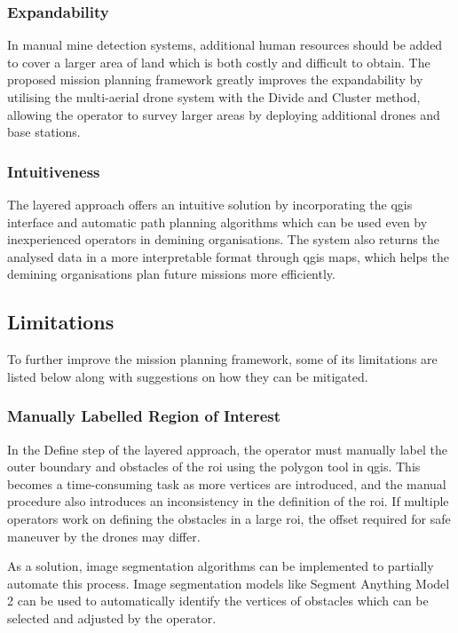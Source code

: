 \subsubsection{Expandability}

In manual mine detection systems, additional human resources should be added to cover a larger area of land which is both costly and difficult to obtain. The proposed mission planning framework greatly improves the expandability by utilising the multi-aerial drone system with the Divide and Cluster method, allowing the operator to survey larger areas by deploying additional drones and base stations. 

\subsubsection{Intuitiveness}

The layered approach offers an intuitive solution by incorporating the \gls{qgis} interface and automatic path planning algorithms which can be used even by inexperienced operators in demining organisations. The system also returns the analysed data in a more interpretable format through \gls{qgis} maps, which helps the demining organisations plan future missions more efficiently.

\subsection{Limitations}
\label{sec:msp_limitations}

To further improve the mission planning framework, some of its limitations are listed below along with suggestions on how they can be mitigated. 

\subsubsection{Manually Labelled Region of Interest}

In the Define step of the layered approach, the operator must manually label the outer boundary and obstacles of the \gls{roi} using the polygon tool in \gls{qgis}. This becomes a time-consuming task as more vertices are introduced, and the manual procedure also introduces an inconsistency in the definition of the \gls{roi}. If multiple operators work on defining the obstacles in a large \gls{roi}, the offset required for safe maneuver by the drones may differ. 

As a solution, image segmentation algorithms can be implemented to partially automate this process. Image segmentation models like Segment Anything Model 2 \cite{ravi2024sam2} can be used to automatically identify the vertices of obstacles which can be selected and adjusted by the operator. 

